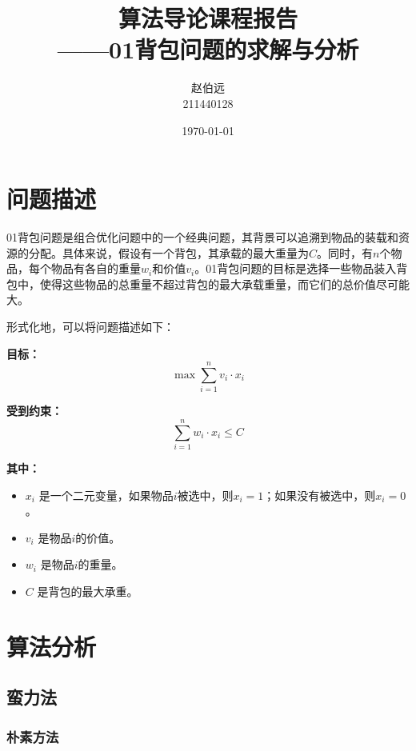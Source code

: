\documentclass[UTF8,titlepage]{ctexart}
\numberwithin{figure}{section}
\begin{document}
\title{算法导论课程报告 \\ \large{——01背包问题的求解与分析}}
\author{赵伯远 \\ 211440128}
\date{\today}
\maketitle

\tableofcontents


\clearpage

\section{问题描述}

01背包问题是组合优化问题中的一个经典问题，其背景可以追溯到物品的装载和资源的分配。具体来说，假设有一个背包，其承载的最大重量为\( C \)。同时，有\( n \)个物品，每个物品有各自的重量\( w_i \)和价值\( v_i \)。01背包问题的目标是选择一些物品装入背包中，使得这些物品的总重量不超过背包的最大承载重量，而它们的总价值尽可能大。

形式化地，可以将问题描述如下：

\textbf{目标：}
\begin{equation}
    \max \sum_{i=1}^{n} v_i \cdot x_i
\end{equation}

\textbf{受到约束：}
\begin{equation}
    \sum_{i=1}^{n} w_i \cdot x_i \leq C
\end{equation}

\textbf{其中：}
\begin{itemize}
    \item \( x_i \) 是一个二元变量，如果物品\( i \)被选中，则\( x_i = 1 \)；如果没有被选中，则\( x_i = 0 \)。
    \item \( v_i \) 是物品\( i \)的价值。
    \item \( w_i \) 是物品\( i \)的重量。
    \item \( C \) 是背包的最大承重。
\end{itemize}

\section{算法分析}

\subsection{蛮力法}

\subsubsection{朴素方法}
\end{document}
